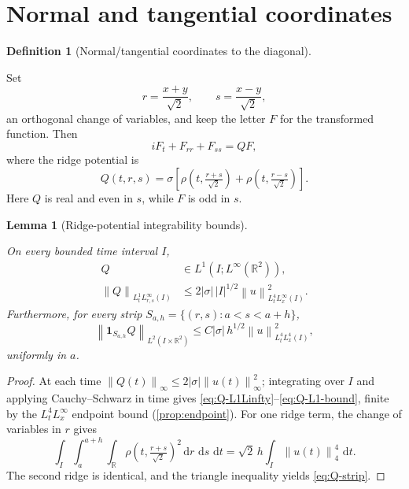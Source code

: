 \documentclass[11pt,oneside]{book}
\providecommand{\uses}[1]{}
\newtheorem{lemma}[theorem]{Lemma}
\theoremstyle{definition}
\newtheorem{definition}[theorem]{Definition}
\theoremstyle{remark}
\newcommand{\R}{\mathbb R}
\newcommand{\1}{\mathbf 1}
\newcommand{\dd}{\,\mathrm d}
\newcommand{\norm}[1]{\left\lVert #1\right\rVert}
\begin{document}
\section{Normal and tangential coordinates}

\begin{definition}[Normal/tangential coordinates to the diagonal]\label{def:normal-tangential-coords}
\uses{def:exterior-product, prop:F-equation}
Set
\begin{equation}
 r=\frac{x+y}{\sqrt2},\qquad s=\frac{x-y}{\sqrt2},  \label{eq:rs-coordinates}
\end{equation}
an orthogonal change of variables, and keep the letter $F$ for the
transformed function. Then
\begin{equation}
 iF_t+F_{rr}+F_{ss}=QF,                              \label{eq:F-rs}
\end{equation}
where the ridge potential is
\begin{equation}
 Q(t,r,s)=\sigma\left[
  \rho\!\left(t,\tfrac{r+s}{\sqrt2}\right)
 +\rho\!\left(t,\tfrac{r-s}{\sqrt2}\right)\right].   \label{eq:Q-ridge}
\end{equation}
Here $Q$ is real and even in $s$, while $F$ is odd in $s$.
\end{definition}

\begin{lemma}[Ridge-potential integrability bounds]\label{lem:Q-bounds}
\uses{def:normal-tangential-coords, prop:F-equation}
On every bounded time interval $I$,
\begin{align}
 Q&\in L^1(I;L^\infty(\R^2)),                        \label{eq:Q-L1Linfty}\\
 \norm Q_{L^1_tL^\infty_{r,s}(I)}
 &\le 2|\sigma|\,|I|^{1/2}\norm u_{L^4_tL^\infty_x(I)}^2.
                                                     \label{eq:Q-L1-bound}
\end{align}
Furthermore, for every strip $S_{a,h}=\{(r,s):a<s<a+h\}$,
\begin{equation}
 \norm{\1_{S_{a,h}}Q}_{L^2(I\times\R^2)}
 \le C|\sigma|\,h^{1/2}\norm u_{L^4_tL^4_x(I)}^2,    \label{eq:Q-strip}
\end{equation}
uniformly in $a$.
\end{lemma}

\begin{proof}
\uses{prop:endpoint}
At each time $\norm{Q(t)}_\infty\le2|\sigma|\norm{u(t)}_\infty^2$;
integrating over $I$ and applying Cauchy--Schwarz in time gives
\eqref{eq:Q-L1Linfty}--\eqref{eq:Q-L1-bound}, finite by the $L^4_tL^\infty_x$
endpoint bound (\cref{prop:endpoint}). For one ridge term, the change of
variables in $r$ gives
\[
 \int_I\!\int_a^{a+h}\!\int_\R
 \rho\!\left(t,\tfrac{r+s}{\sqrt2}\right)^2\dd r\,\dd s\,\dd t
 =\sqrt2\,h\int_I\norm{u(t)}_4^4\,\dd t .
\]
The second ridge is identical, and the triangle inequality yields
\eqref{eq:Q-strip}.
\end{proof}
\end{document}
